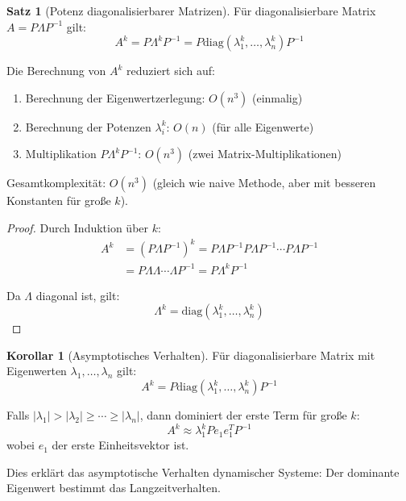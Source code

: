 \documentclass[a4paper,12pt]{report}
\theoremstyle{definition}
\newtheorem{satz}{Satz}
\newtheorem{korollar}{Korollar}
\begin{document}
	\begin{satz}[Potenz diagonalisierbarer Matrizen]
		Für diagonalisierbare Matrix $A = P \Lambda P^{-1}$ gilt:
		\[
		A^k = P \Lambda^k P^{-1} = P \text{diag}(\lambda_1^k, \ldots, \lambda_n^k) P^{-1}
		\]
		
		Die Berechnung von $A^k$ reduziert sich auf:
		\begin{enumerate}
			\item Berechnung der Eigenwertzerlegung: $O(n^3)$ (einmalig)
			\item Berechnung der Potenzen $\lambda_i^k$: $O(n)$ (für alle Eigenwerte)
			\item Multiplikation $P \Lambda^k P^{-1}$: $O(n^3)$ (zwei Matrix-Multiplikationen)
		\end{enumerate}
		
		Gesamtkomplexität: $O(n^3)$ (gleich wie naive Methode, aber mit besseren Konstanten für große $k$).
	\end{satz}
	
	\begin{proof}
		Durch Induktion über $k$:
		\begin{align}
			A^k &= (P \Lambda P^{-1})^k = P \Lambda P^{-1} P \Lambda P^{-1} \cdots P \Lambda P^{-1} \\
			&= P \Lambda \Lambda \cdots \Lambda P^{-1} = P \Lambda^k P^{-1}
		\end{align}
		
		Da $\Lambda$ diagonal ist, gilt:
		\[
		\Lambda^k = \text{diag}(\lambda_1^k, \ldots, \lambda_n^k)
		\]
	\end{proof}
	
	\begin{korollar}[Asymptotisches Verhalten]
		Für diagonalisierbare Matrix mit Eigenwerten $\lambda_1, \ldots, \lambda_n$ gilt:
		\[
		A^k = P \text{diag}(\lambda_1^k, \ldots, \lambda_n^k) P^{-1}
		\]
		
		Falls $|\lambda_1| > |\lambda_2| \geq \cdots \geq |\lambda_n|$, dann dominiert der erste Term für große $k$:
		\[
		A^k \approx \lambda_1^k P e_1 e_1^T P^{-1}
		\]
		wobei $e_1$ der erste Einheitsvektor ist.
		
		Dies erklärt das asymptotische Verhalten dynamischer Systeme: Der dominante Eigenwert bestimmt das Langzeitverhalten.
	\end{korollar}
	
\end{document}
